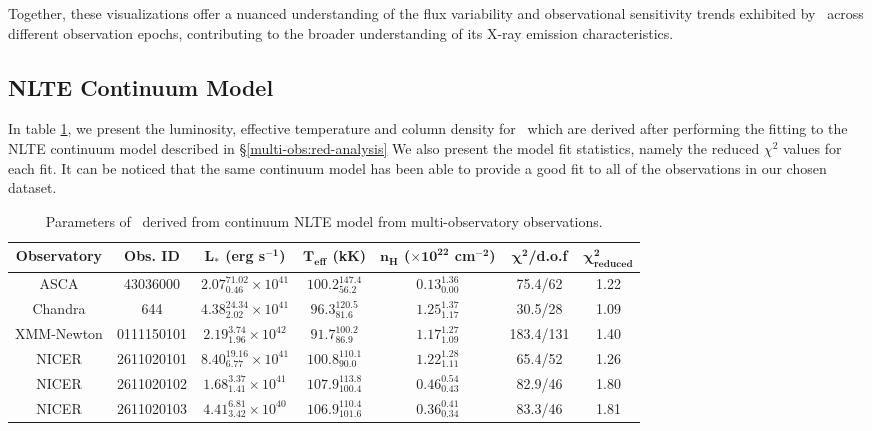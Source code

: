 		    Together, these visualizations offer a nuanced understanding of the flux variability and observational sensitivity trends exhibited by \source\ across different observation epochs, contributing to the broader understanding of its X-ray emission characteristics.
    	
    	\begin{landscape}
    	\subsection{NLTE Continuum Model} \label{multi-obs:results:nlte}
    		In table \ref{tab:res-fitting}, we present the luminosity, effective temperature and column density for \source\ which are derived after performing the fitting to the NLTE continuum model described in \S \ref{multi-obs:red-analysis} We also present the model fit statistics, namely the reduced $\chi^2$ values for each fit. It can be noticed that the same continuum model has been able to provide a good fit to all of the observations in our chosen dataset.
    		
    		\renewcommand{\arraystretch}{2.2}
    		\begin{table}[!htb]
		    	\centering
		    	\caption{Parameters of \source\ derived from continuum NLTE model from multi-observatory observations.}
		    	\label{tab:res-fitting}
		    	\begin{tabular}{ccccccc}
					\hline
					{\textbf{Observatory}} & {\textbf{Obs. ID}} & {$\boldsymbol{L_*}$ \textbf{(erg s$\boldsymbol{^{-1}}$)}} & {\textbf{$\boldsymbol{T_\text{eff}}$ (kK)}} & {\textbf{$\boldsymbol{n_H}$ ($\boldsymbol{\times 10^{22}}$ cm$\boldsymbol{^{-2}}$)}} & {$\boldsymbol{\chi^2}$/\textbf{d.o.f}} & {$\boldsymbol{\chi^2_\text{reduced}}$} \\
					\hline
					{ASCA} & {43036000} & {$2.07_{0.46}^{71.02}\times 10^{41}$} & {$100.2_{56.2}^{147.4}$} & {$0.13_{0.00}^{1.36}$} & {75.4/62} & {1.22} \\ %
					{Chandra} & {644} & {$4.38_{2.02}^{24.34}\times 10^{41}$} & {$96.3_{81.6}^{120.5}$} & {$1.25_{1.17}^{1.37}$} & {30.5/28} & {1.09} \\ %
					{XMM-Newton} & {0111150101} & {$2.19_{1.96}^{3.74}\times 10^{42}$} & {$91.7_{86.9}^{100.2}$} & {$1.17_{1.09}^{1.27}$} & {183.4/131} & {1.40} \\ %
					{NICER} & {2611020101} & {$8.40_{6.77}^{19.16}\times 10^{41}$} & {$100.8_{90.0}^{110.1}$} & {$1.22_{1.11}^{1.28}$} & {65.4/52} & {1.26} \\ %
					{NICER} & {2611020102} & {$1.68_{1.41}^{3.37}\times 10^{41}$} & {$107.9_{100.4}^{113.8}$} & {$0.46_{0.43}^{0.54}$} & {82.9/46} & {1.80} \\ %
					{NICER} & {2611020103} & {$4.41_{3.42}^{6.81}\times 10^{40}$} & {$106.9_{101.6}^{110.4}$} & {$0.36_{0.34}^{0.41}$} & {83.3/46} & {1.81} \\ %
					\hline
				\end{tabular}
			\end{table}
			\renewcommand{\arraystretch}{1.6}
			\end{landscape}
    	
